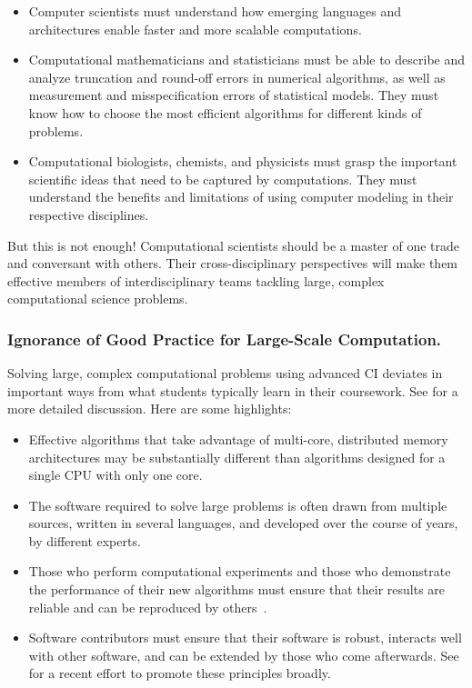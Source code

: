 \documentclass[11pt]{NSFamsart}
\begin{document}
\begin{itemize}
\item Computer scientists must understand how emerging languages and architectures enable faster and more scalable computations.  

\item Computational mathematicians and statisticians must be able to describe and analyze truncation and round-off errors in numerical algorithms, as well as measurement and misspecification errors of statistical models.  They must know how to choose the most efficient algorithms for different kinds of problems.

\item Computational biologists, chemists, and physicists must grasp the important scientific ideas that need to be captured by computations.  They must understand the benefits and limitations of using computer modeling in their respective disciplines.

\end{itemize}
But this is not enough!  Computational scientists should be a master of one trade and conversant with others.   Their cross-disciplinary perspectives will make them effective members of interdisciplinary teams tackling large, complex computational science problems.

\subsubsection*{Ignorance of Good Practice for Large-Scale Computation.}  Solving large, complex computational problems using advanced CI deviates in important ways from what students typically learn in their coursework. See \cite[Sect.\ 2.4]{RudEtal18a} for a more detailed discussion.  Here are some highlights:

\begin{itemize}

\item Effective algorithms that take advantage of multi-core, distributed memory architectures may be substantially different than algorithms designed for a single CPU with only one core.

\item The software required to solve large problems is often drawn from multiple sources, written in several languages, and developed over the course of years, by different experts.

\item Those who perform computational experiments and those who demonstrate the performance of their new algorithms must ensure that their results are reliable and can be reproduced by others~\cite{Pen11}.  

\item Software contributors must ensure that their software is robust, interacts well with other software, and can be extended by those who come afterwards.  See \cite{BSS18} for a recent effort to promote these principles broadly.

\end{itemize}
\end{document}
